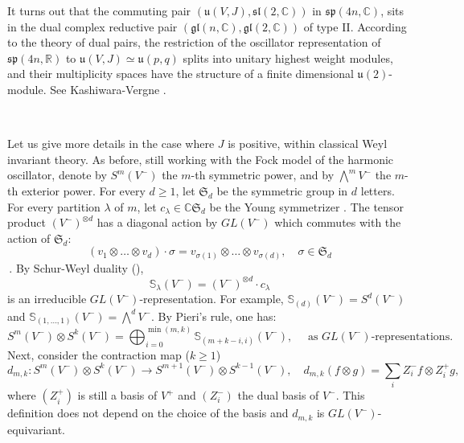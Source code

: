 \documentclass{amsart}[draft,11pt]
\numberwithin{equation}{section}
\theoremstyle{definition}
\begin{document}
It turns out that the commuting pair $(\mathfrak{u}(V,J),\mathfrak{sl}(2,\mathbb C))$ in 
$\mathfrak{sp}(4n,\mathbb C)$, sits in the dual complex reductive pair $(\mathfrak{gl}(n,\mathbb C),\mathfrak{gl}(2,\mathbb C))$ of type II.
According to the theory of dual pairs, the restriction of the oscillator representation of $\mathfrak{sp}(4n,\mathbb R)$ to $\mathfrak{u}(V,J)\simeq\mathfrak{u}(p,q)$ 
 splits into unitary highest weight modules, and  their multiplicity spaces have the structure of a finite dimensional  $\mathfrak{u}(2)$-module. See Kashiwara-Vergne \cite[Theorem 7.2]{KV}.

\

Let us give more details in the case where $J$ is positive, within classical Weyl invariant theory. As before, still working with the Fock model of the harmonic oscillator, denote by $S^m(V^-)$ the $m$-th symmetric power,  and by ${\bigwedge}^m V^-$ the $m$-th exterior power. For every $d\ge 1$, let $\mathfrak{S}_d$ be the symmetric group in $d$ letters. For every partition $\lambda$ of $m$, let $c_\lambda\in \mathbb C \mathfrak{S}_d$ be the Young symmetrizer \cite[\S4]{FH}. The tensor product $(V^-)^{\otimes d}$ has a diagonal action by $GL(V^-)$ which commutes with the action of $\mathfrak{S}_d$:
\[
(v_1\otimes\dots\otimes v_d)\cdot \sigma=v_{\sigma(1)}\otimes\dots\otimes v_{\sigma(d)},\quad \sigma\in \mathfrak{S}_d
\]\,.
By Schur-Weyl duality (\cite[\S6]{FH}), 
\[
\mathbb S_\lambda(V^-)=(V^-)^{\otimes d}\cdot c_\lambda
\]
is an irreducible $GL(V^-)$-representation. 
For example, $\mathbb S_{(d)}(V^-)=S^d(V^-)$ and $\mathbb S_{(1,\dots,1)}(V^-)={\bigwedge}^d V^-.$ By Pieri's rule, one has:
\begin{equation}
    S^m(V^-)\otimes S^k(V^-)=\bigoplus_{i=0}^{\min(m,k)} \mathbb S_{(m+k-i,i)}(V^-),\quad \text{ as }GL(V^-)\text{-representations}.
\end{equation}
Next, consider the contraction map ($k\ge 1$)
\[d_{m,k}:S^m(V^-)\otimes S^k(V^-)\to S^{m+1}(V^-)\otimes S^{k-1}(V^-),\quad d_{m,k}(f\otimes g)=\sum_{i} Z_i^- f\otimes Z_i^+ g,
\]
where $(Z_i^+)$ is still a basis of $V^+$ and $(Z_i^-)$ the dual basis of $V^-$. This definition does not depend on the choice of the basis and $d_{m,k}$ is $GL(V^-)$-equivariant.
\end{document}

